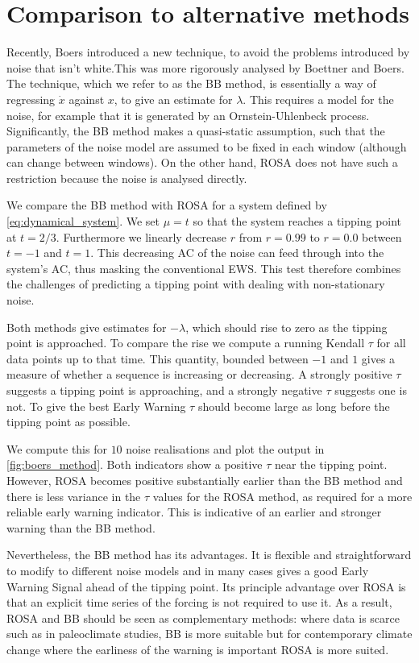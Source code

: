\section{Comparison to alternative methods}
Recently, Boers\cite{Boers2021a} introduced a new technique,
to avoid the problems introduced by noise that isn't white.This was
more rigorously analysed by Boettner and Boers\cite{Boettner2022}. The
technique, which we refer to as the BB method, is essentially a way of
regressing $\dot{x}$ against $x$, to give an estimate for $\lambda$. 
This requires a model for the noise, for example that it is
generated by an Ornstein-Uhlenbeck process. Significantly, the BB method makes a quasi-static assumption, such that the parameters of the noise
model are assumed to be fixed in each window (although can change between windows). On the other hand,
ROSA does not have such a restriction because the noise is analysed directly.

We compare the BB method with ROSA for a system defined by
\cref{eq:dynamical_system}. We set $\mu  = t$ so that the system
reaches a tipping point at $t=2/3$. Furthermore we linearly decrease
$r$ from $r=0.99$ to $r=0.0$ between $t=-1$ and $t=1$.
This decreasing AC of the
noise can feed through into the system's AC, thus masking
the conventional EWS. This test therefore
combines the challenges of predicting a tipping point with dealing
with non-stationary noise.

Both methods give estimates for $-\lambda$, which should rise
to zero as the tipping point is approached. To compare the 
rise we compute a running Kendall $\tau$\cite{Wilks2019} for all data points up to
that time. This quantity, bounded 
between $-1$ and $1$ gives a measure of whether a sequence is 
increasing or decreasing. A strongly positive $\tau$ suggests a tipping point is approaching, and a strongly
negative $\tau$ suggests one is not. To give the best Early Warning $\tau$ should become
large as long before the tipping point as possible.


We compute this for $10$ noise realisations and plot the output 
in \cref{fig:boers_method}. Both indicators show a positive 
$\tau$ near the tipping point. However, ROSA becomes positive substantially earlier than the BB method and there is
less variance in the $\tau$ values for the ROSA method, as required for a more reliable early warning indicator.
This is indicative of an earlier and stronger warning than the BB method. 

Nevertheless, the BB method has its advantages.
It is flexible and straightforward to modify to different noise
models and in many cases gives a good Early Warning Signal 
ahead of the tipping point. Its principle advantage
over ROSA is that an explicit time series of the forcing is not required to use it. As a result, ROSA and BB should be seen as complementary methods: 
where data is scarce such as in paleoclimate studies, BB is more suitable but 
for contemporary climate change where the earliness of the warning is 
important ROSA is more suited.

